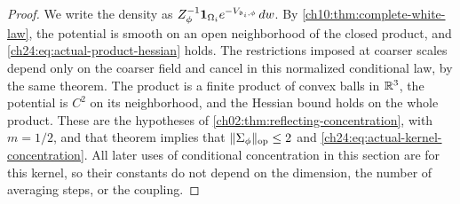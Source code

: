 \begin{proof}
We write the density as $Z_\phi^{-1}\mathbf 1_{\Omega_i}e^{-V_{\mathfrak d_i,\phi}}\,dw$. By \cref{ch10:thm:complete-white-law}, the potential is smooth on an open neighborhood of the closed product, and \eqref{ch24:eq:actual-product-hessian} holds. The restrictions imposed at coarser scales depend only on the coarser field and cancel in this normalized conditional law, by the same theorem. The product is a finite product of convex balls in $\mathbb R^3$, the potential is $C^2$ on its neighborhood, and the Hessian bound holds on the whole product. These are the hypotheses of \cref{ch02:thm:reflecting-concentration}, with $m=1/2$, and that theorem implies that $\lVert \Sigma_\phi\rVert_{\mathrm{op}}\le2$ and \eqref{ch24:eq:actual-kernel-concentration}. All later uses of conditional concentration in this section are for this kernel, so their constants do not depend on the dimension, the number of averaging steps, or the coupling.


\end{proof}
